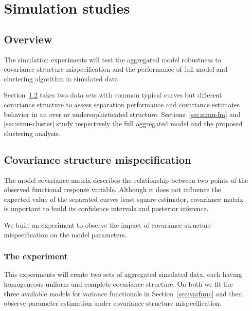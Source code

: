 



\chapter{Simulation studies}

\section{Overview}
\label{sec:overview}

The simulation experiments will test the aggregated model robustness to covariance structure mispecification and the performance of full model and clustering algorithm in simulated data.

Section~\ref{sec:mpc} takes two data sets with common typical curves but different covariance structure to assess separation performance and covariance estimates behavior in an over or undersophisticated structure. Sections~\ref{sec:simu-fm} and \ref{sec:simu-cluster} study respectively the full aggregated model and the proposed clustering analysis.


\section{Covariance structure mispecification}
\label{sec:mpc}

The model covariance matrix describes the relationship between two points of the observed functional response variable. Although it does not influence the expected value of the separated curves least square estimator, covariance matrix is important to build its confidence intervals and posterior inference.

We built an experiment to observe the impact of covariance structure mispecification on the model parameters. 

\subsection{The experiment}
\label{sec:simu-exp1}

This experiments will create two sets of aggregated simulated data, each having homogeneous uniform and complete covariance structure. On both we fit the three available models for variance functionals in Section~\ref{sec:varfunc} and then observe parameter estimation under covariance structure mispecification.


